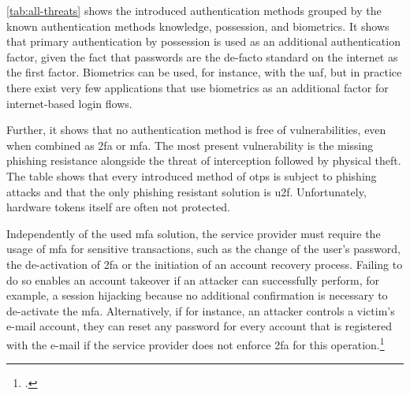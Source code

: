 \autoref{tab:all-threats} shows the introduced authentication methods grouped by the known authentication methods knowledge, possession, and biometrics. It shows that primary authentication by possession is used as an additional authentication factor, given the fact that passwords are the de-facto standard on the internet as the first factor. Biometrics can be used, for instance, with the \gls{uaf}, but in practice there exist very few applications that use biometrics as an additional factor for internet-based login flows.

Further, it shows that no authentication method is free of vulnerabilities, even when combined as \gls{2fa} or \gls{mfa}. The most present vulnerability is the missing phishing resistance alongside the threat of interception followed by physical theft. The table shows that every introduced method of \glspl{otp} is subject to phishing attacks and that the only phishing resistant solution is \gls{u2f}. Unfortunately, hardware tokens itself are often not protected.

Independently of the used \gls{mfa} solution, the service provider must require the usage of \gls{mfa} for sensitive transactions, such as the change of the user's password, the de-activation of \gls{2fa} or the initiation of an account recovery process. Failing to do so enables an account takeover if an attacker can successfully perform, for example, a session hijacking because no additional confirmation is necessary to de-activate the \gls{mfa}. Alternatively, if for instance, an attacker controls a victim's e-mail account, they can reset any password for every account that is registered with the e-mail if the service provider does not enforce \gls{2fa} for this operation.\footcites[See][370]{10.1007/978-3-662-45472-5_24}
